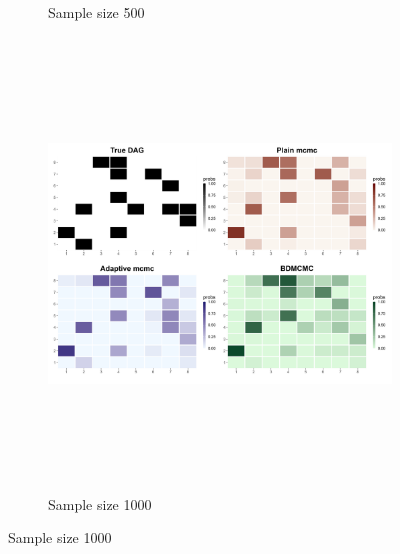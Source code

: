 \documentclass{report}
\begin{document}
\begin{figure}[!ht]
{\begin{minipage}{\textwidth}
\begin{subfigure}[b]{0.45\textwidth}
				\caption{Sample size 500}
				\label{fig:heatmaps-100}
			\end{subfigure}
			\hspace{0.35cm}
			\begin{subfigure}[b]{0.45\textwidth}   
				\centering
				\includegraphics[width=\textwidth, height=12cm]{Figures/Overall_comparison/Random_dags/heat_dag_3_n_1000.png}
				\caption{Sample size 1000}
				\label{fig:heatmaps-100}
			\end{subfigure}
			
			\vspace{0.4cm}   %
			

\end{minipage}}
\end{figure}
\end{document}
